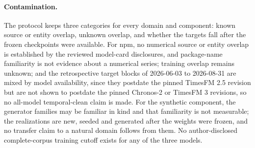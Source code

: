 \paragraph{Contamination.} The protocol keeps three categories for every domain and component: known
source or entity overlap, unknown overlap, and whether the targets fall after the frozen checkpoints were
available. For npm, no numerical source or entity overlap is established by the reviewed model-card
disclosures, and package-name familiarity is not evidence about a numerical series; training overlap
remains unknown; and the retrospective target blocks of 2026-06-03 to 2026-08-31 are mixed by model
availability, since they postdate the pinned TimesFM 2.5 revision but are not shown to postdate the pinned
Chronos-2 or TimesFM 3 revisions, so no all-model temporal-clean claim is made. For the synthetic component,
the generator families may be familiar in kind and that familiarity is not measurable; the realizations are
new, seeded and generated after the weights were frozen, and no transfer claim to a natural domain follows
from them. No author-disclosed complete-corpus training cutoff exists for any of the three models.
